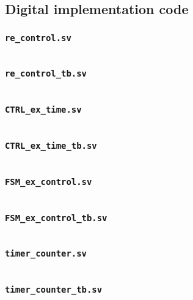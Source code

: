 \subsection{Digital implementation code}\label{app:digital}

\subsubsection{\texttt{re\_control.sv}}
\inputminted{systemverilog}{Code/Verilog/re_control.sv}

\clearpage
\subsubsection{\texttt{re\_control\_tb.sv}}
\inputminted{systemverilog}{Code/Verilog/re_control_tb.sv}

\clearpage
\subsubsection{\texttt{CTRL\_ex\_time.sv}}
\inputminted{systemverilog}{Code/Verilog/CTRL_ex_time.sv}

\clearpage
\subsubsection{\texttt{CTRL\_ex\_time\_tb.sv}}
\inputminted{systemverilog}{Code/Verilog/CTRL_ex_time_tb.sv}

\subsubsection{\texttt{FSM\_ex\_control.sv}}
\inputminted{systemverilog}{Code/Verilog/FSM_ex_control.sv}

\clearpage
\subsubsection{\texttt{FSM\_ex\_control\_tb.sv}}
\inputminted{systemverilog}{Code/Verilog/FSM_ex_control_tb.sv}

\clearpage
\subsubsection{\texttt{timer\_counter.sv}}
\inputminted{systemverilog}{Code/Verilog/timer_counter.sv}

\clearpage
\subsubsection{\texttt{timer\_counter\_tb.sv}}
\inputminted{systemverilog}{Code/Verilog/timer_counter_tb.sv}